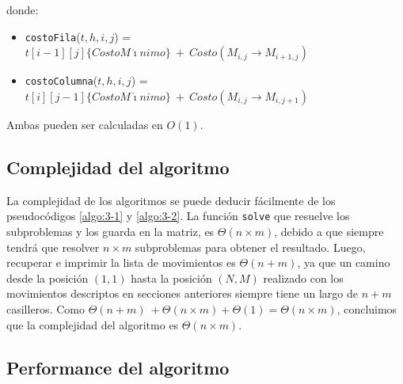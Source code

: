 donde:
\begin{itemize}
\item \texttt{costoFila}($t,h,i,j$) = $t[i-1][j]\{CostoM\acute{\imath}nimo\}\ + \ Costo(M_{i,j} \rightarrow M_{i+1,j})$
\item \texttt{costoColumna}($t,h,i,j$) = $t[i][j-1]\{CostoM\acute{\imath}nimo\}\ + \ Costo(M_{i,j} \rightarrow M_{i,j+1})$
\end{itemize}
Ambas pueden ser calculadas en $O(1)$.

\subsection{Complejidad del algoritmo}

La complejidad de los algoritmos se puede deducir fácilmente de los pseudocódigos \ref{algo:3-1} y \ref{algo:3-2}. La función \texttt{solve} que resuelve los subproblemas y los guarda en la matriz, es $\Theta(n\times m)$, debido a que siempre tendrá que resolver $n\times m$ subproblemas para obtener el resultado. Luego, recuperar e imprimir la lista de movimientos es $\Theta(n+m)$, ya que un camino desde la posición $(1,1)$ hasta la posición $(N,M)$ realizado con los movimientos descriptos en secciones anteriores siempre tiene un largo de $n+m$ casilleros. Como $\Theta(n+m) \ + \Theta(n\times m) + \Theta(1) = \Theta(n\times m)$, concluimos que la complejidad del algoritmo es \textbf{$\Theta(n\times m)$}.

\subsection{Performance del algoritmo}

